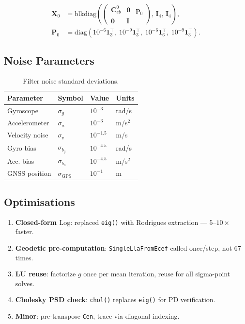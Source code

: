 \documentclass[11pt,a4paper]{article}
\theoremstyle{definition}
\theoremstyle{plain}
\newcommand{\Log}{\mathrm{Log}}
\newcommand{\Ceb}{\mathbf{C}_{eb}}
\newcommand{\bX}{\mathbf{X}}
\newcommand{\bP}{\mathbf{P}}
\begin{document}
\begin{align}
  \bX_0 &= \mathrm{blkdiag}\!\left(
    \begin{pmatrix}\Ceb^0 & \mathbf{0} & \mathbf{p}_0\\\mathbf{0}&\mathbf{I}\end{pmatrix},\,
    \mathbf{I}_4,\,\mathbf{I}_4
  \right)\!, \\
  \bP_0 &= \mathrm{diag}(
    10^{-6}\mathbf{1}_3^\top,\;
    10^{-9}\mathbf{1}_3^\top,\;
    10^{-6}\mathbf{1}_6^\top,\;
    10^{-9}\mathbf{1}_3^\top).
\end{align}

\subsection{Noise Parameters}

\begin{table}[h!]
\centering
\caption{Filter noise standard deviations.}
\renewcommand{\arraystretch}{1.3}
\begin{tabular}{@{}llll@{}}
\toprule
Parameter & Symbol & Value & Units \\
\midrule
Gyroscope & $\sigma_g$ & $10^{-3}$ & rad/s \\
Accelerometer & $\sigma_a$ & $10^{-3}$ & m/s$^2$ \\
Velocity noise & $\sigma_v$ & $10^{-1.5}$ & m/s \\
Gyro bias & $\sigma_{b_g}$ & $10^{-4.5}$ & rad/s \\
Acc. bias & $\sigma_{b_a}$ & $10^{-4.5}$ & m/s$^2$ \\
GNSS position & $\sigma_{\mathrm{GPS}}$ & $10^{-1}$ & m \\
\bottomrule
\end{tabular}
\end{table}

\subsection{Optimisations}

\begin{enumerate}
  \item \textbf{Closed-form $\Log$}: replaced \texttt{eig()} with Rodrigues extraction --- $5$--$10\times$ faster.
  \item \textbf{Geodetic pre-computation}: \texttt{SingleLlaFromEcef} called once/step, not 67 times.
  \item \textbf{LU reuse}: factorize $g$ once per mean iteration, reuse for all sigma-point solves.
  \item \textbf{Cholesky PSD check}: \texttt{chol()} replaces \texttt{eig()} for PD verification.
  \item \textbf{Minor}: pre-transpose \texttt{Cen}, trace via diagonal indexing.
\end{enumerate}
\end{document}
